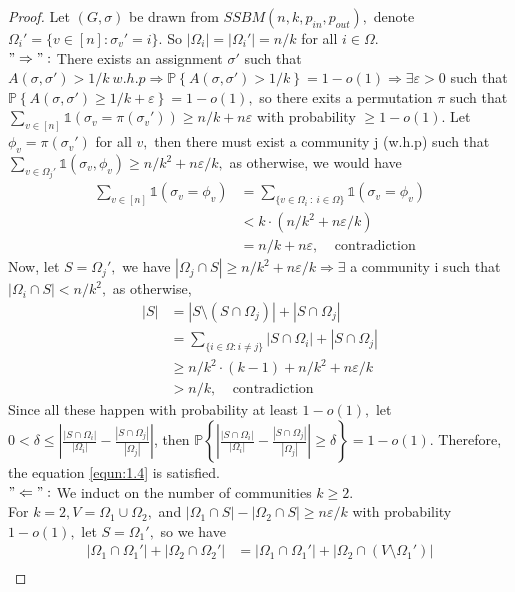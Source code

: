 \begin{proof}
    Let $(G, \sigma)$ be drawn from $SSBM(n, k, p_{in}, p_{out}),$ denote $\Omega_i' = \{ v\in [n] : \sigma_v' = i \}.$ So $|\Omega_i|=|\Omega_i'|=n/k$ for all $i\in\Omega.$ \vspace{1mm}\\
    $"\Rightarrow":$ There exists an assignment $\sigma'$ such that $A(\sigma, \sigma')>1/k~w.h.p \Rightarrow \mathbb{P}\left\{A(\sigma, \sigma')>1/k\right\}=1-o(1)\Rightarrow\exists\varepsilon>0$ such that $\mathbb{P}\left\{A(\sigma, \sigma')\geq1/k+\varepsilon\right\}=1-o(1),$ so there exits a permutation $\pi$ such that $\sum_{v\in[n]}\mathbb{1}(\sigma_v=\pi(\sigma_v'))\geq n/k + n\varepsilon$ with probability $\geq 1-o(1)$. Let $\phi_v=\pi(\sigma_v')$ for all $v,$  then there must exist a community j (w.h.p) such that $\sum_{v\in \Omega_j'}\mathbb{1}(\sigma_v, \phi_v)\geq n/k^2 +n\varepsilon/k,$ as otherwise, we would have 
    \begin{align*}
        \sum_{v\in[n]}\mathbb{1}(\sigma_v=\phi_v)&=\sum_{\{v\in\Omega_i^{}~:~i\in\Omega\}}\mathbb{1}(\sigma_v=\phi_v)\\
        &< k\cdot(n/k^2 +n\varepsilon/k)\\
        &= n/k + n\varepsilon,~~~~~\text{contradiction}
    \end{align*} Now, let $S=\Omega_j',$ we have $|\Omega_j\cap S|\geq n/k^2 +n\varepsilon/k \Rightarrow \exists$ a community i such that $|\Omega_i\cap S|<n/k^2,$ as otherwise, 
    \begin{align*}
         |S|&=|S\setminus(S\cap\Omega_j)|+|S\cap\Omega_j|\\
         &=\sum_{\{i\in\Omega:i\neq j\}}|S\cap\Omega_i|+|S\cap\Omega_j|\\
         &\geq n/k^2\cdot(k-1)+n/k^2 +n\varepsilon/k\\
         &>n/k,~~~~~\text{contradiction}
    \end{align*}
    Since all these happen with probability at least $1-o(1),$ let $0<\delta\leq\left| \frac{|S \cap \Omega_i|}{|\Omega_i|} - \frac{|S \cap \Omega_j|}{|\Omega_j|} \right|$, then $\mathbb{P}\left\{ \left| \frac{|S \cap \Omega_i|}{|\Omega_i|} - \frac{|S \cap \Omega_j|}{|\Omega_j|} \right| \geq \delta \right\} = 1 - o(1).$ Therefore, the equation \ref{equn:1.4} is satisfied.
    \vspace{3mm}\\
    $"\Leftarrow":$ We induct on the number of communities $k\geq 2$.\\
    For $k=2, V=\Omega_1\cup\Omega_2,$ and $|\Omega_1\cap S|-|\Omega_2\cap S|\geq n\varepsilon/k$ with probability $1-o(1),$ let $S=\Omega_1',$ so we have \begin{align*} |\Omega_1\cap\Omega_1'|+|\Omega_2\cap\Omega_2'|&=|\Omega_1\cap\Omega_1'|+|\Omega_2\cap(V\setminus\Omega_1')|\\

\end{align*}
\end{proof}
